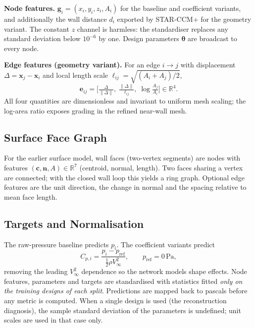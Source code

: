 \documentclass[journal]{IEEEtran}
\newcommand{\Vin}{V_{\infty}}
\begin{document}
\textbf{Node features.} $\mathbf{g}_i=(x_i,y_i,z_i,A_i)$ for the baseline and
coefficient variants, and additionally the wall distance $d_i$ exported by
STAR-CCM+ for the geometry variant. The constant $z$ channel is harmless:
the standardiser replaces any standard deviation below $10^{-6}$ by one.
Design parameters $\boldsymbol{\theta}$ are broadcast to every node.

\textbf{Edge features (geometry variant).} For an edge $i\!\to\!j$ with
displacement $\Delta=\mathbf{x}_j-\mathbf{x}_i$ and local length scale
$\ell_{ij}=\sqrt{(A_i+A_j)/2}$,
\begin{equation}
\mathbf{e}_{ij}=\Big[\tfrac{\Delta}{\|\Delta\|},\;
\tfrac{\|\Delta\|}{\ell_{ij}},\;\log\tfrac{A_j}{A_i}\Big]\in\mathbb{R}^4.
\end{equation}
All four quantities are dimensionless and invariant to uniform mesh scaling;
the log-area ratio exposes grading in the refined near-wall mesh.

\subsection{Surface Face Graph}
For the earlier surface model, wall faces (two-vertex segments) are nodes with
features $(\mathbf{c},\mathbf{n},A)\in\mathbb{R}^7$ (centroid, normal, length).
Two faces sharing a vertex are connected; with the closed wall loop this yields
a ring graph. Optional edge features are the unit direction, the change in
normal and the spacing relative to mean face length.

\subsection{Targets and Normalisation}
\label{sec:targets}
The raw-pressure baseline predicts $p_i$. The coefficient variants predict
\begin{equation}
C_{p,i}=\frac{p_i-p_\mathrm{ref}}{\tfrac12\rho\Vin^2},\qquad p_\mathrm{ref}=0\,\mathrm{Pa},
\label{eq:cp}
\end{equation}
removing the leading $\Vin^2$ dependence so the network models shape effects.
Node features, parameters and targets are standardised with statistics fitted
\emph{only on the training designs of each split}. Predictions are mapped back
to pascals before any metric is computed. When a single design is used (the
reconstruction diagnosis), the sample standard deviation of the parameters is
undefined; unit scales are used in that case only.

\end{document}

